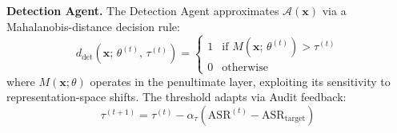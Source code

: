 \documentclass[review,1p,times,number]{elsarticle}
\begin{document}
\begin{table}[htbp]
\caption{A3L Agent Specifications}
\label{tab:agents}
\centering
{}
\end{table}

\textbf{Detection Agent.}
The Detection Agent approximates $\mathcal{A}(\mathbf{x})$ via a
Mahalanobis-distance decision rule:
\begin{equation}
d_{\mathrm{det}}(\mathbf{x};\,\theta^{(t)},\,\tau^{(t)}) =
\begin{cases}
  1 & \text{if } M(\mathbf{x};\,\theta^{(t)}) > \tau^{(t)} \\
  0 & \text{otherwise}
\end{cases}
\label{eq:det_decision}
\end{equation}
where $M(\mathbf{x};\theta)$ operates in the penultimate layer,
exploiting its sensitivity to representation-space
shifts. The threshold adapts via Audit feedback:
\begin{equation}
\tau^{(t+1)} = \tau^{(t)} -
\alpha_\tau \!\left(\mathrm{ASR}^{(t)} -
\mathrm{ASR}_{\mathrm{target}}\right)
\label{eq:det_adapt}
\end{equation}
\end{document}
